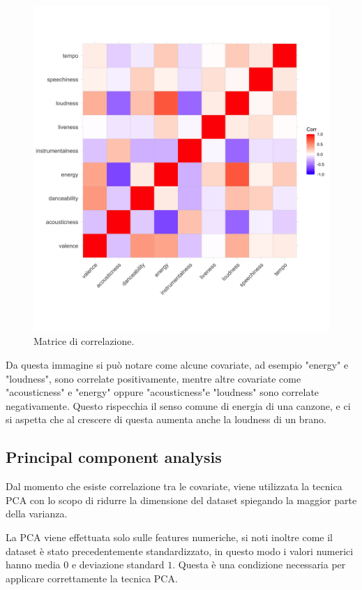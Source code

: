 \begin{figure}[H]
	\centering
	\includegraphics[width=14cm]{../images/correlation.png}
	\caption{Matrice di correlazione.}
\end{figure}

Da questa immagine si può notare come alcune covariate, ad esempio "energy" e "loudness", sono correlate positivamente, mentre altre covariate come "acousticness" e "energy" oppure "acousticness"e "loudness" sono correlate negativamente. Questo rispecchia il senso comune di energia di una canzone, e ci si aspetta che al crescere di questa aumenta anche la loudness di un brano.

\subsection{Principal component analysis}
\label{sec:pca}
Dal momento che esiste correlazione tra le covariate, viene utilizzata la tecnica PCA con lo scopo di ridurre la dimensione del dataset spiegando la maggior parte della varianza.

La PCA viene effettuata solo sulle features numeriche, si noti inoltre come il dataset è stato precedentemente standardizzato, in questo modo i valori numerici hanno media $0$ e deviazione standard $1$. Questa è una condizione necessaria per applicare correttamente la tecnica PCA.


